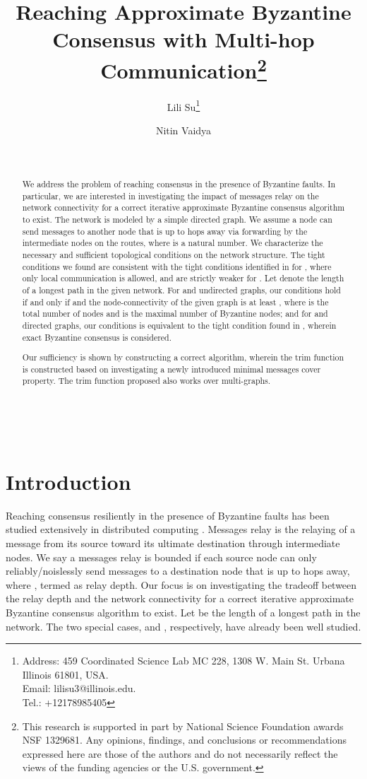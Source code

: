 \documentclass[letterpaper, 11pt]{article}
\title{Reaching Approximate Byzantine Consensus with Multi-hop Communication\thanks{This research is supported in part by National Science Foundation awards NSF 1329681.
Any opinions, findings, and conclusions or recommendations expressed here are those of the authors
and do not necessarily reflect the views of the funding agencies or the U.S. government.}
}
\author{Lili Su\thanks{Address: 459 Coordinated Science Lab MC 228, 1308 W. Main St.
Urbana Illinois 61801, USA. \\
Email: lilisu3@illinois.edu. \\
Tel.: +12178985405
}}
\author{Nitin Vaidya}
\affil{ Department of Electrical and Computer Engineering\\ University of Illinois at Urbana-Champaign}
\begin{document}
\date{~}

\maketitle



~
\begin{abstract}
We address the problem of reaching consensus in the presence of Byzantine faults. In particular, we are interested in investigating the impact of messages relay on the network connectivity for a correct iterative approximate Byzantine consensus algorithm to exist.
The network is modeled by a simple directed graph. We assume a node can send messages to another node that is up to  hops away via forwarding by the intermediate nodes on the routes,
where  is a natural number. We characterize the necessary and sufficient topological conditions on the network structure. The tight conditions we found are consistent with the tight conditions identified in \cite{Vaidya2012IABC} for , where only local communication is allowed, and are strictly weaker
for . Let  denote the length of a longest path in the given network.  For  and undirected graphs, our conditions hold if and only if   and the node-connectivity of the given graph is at least  , where  is the total number of nodes and  is the maximal number of Byzantine nodes; and for  and directed graphs, our conditions is equivalent to the tight condition found in \cite{Tseng2014}, wherein exact Byzantine consensus is considered.

Our sufficiency is shown by constructing a correct algorithm, wherein the trim function is constructed based on investigating a newly introduced minimal messages cover property.
The trim function proposed also works over multi-graphs.


\end{abstract}





\newpage
\section{Introduction}
\label{sec:intro}





 Reaching consensus resiliently in the presence of Byzantine faults has been studied extensively in distributed computing \cite{Lamport1982, Rabin1983, Ben-Or1983, AA_Fekete_aoptimal,Ben-Or2010}. Messages relay is the relaying of a message from its source toward its ultimate destination through intermediate nodes.
We say a messages relay is bounded if each source node can only reliably/noislessly send messages to a destination node that is up to  hops away, where , termed as relay depth. Our focus is on investigating the tradeoff between the relay depth  and the network connectivity for a correct iterative approximate Byzantine consensus algorithm to exist. Let  be the length of a longest path in the network. The two special cases,  and , respectively, have already been well studied.
\end{document}
